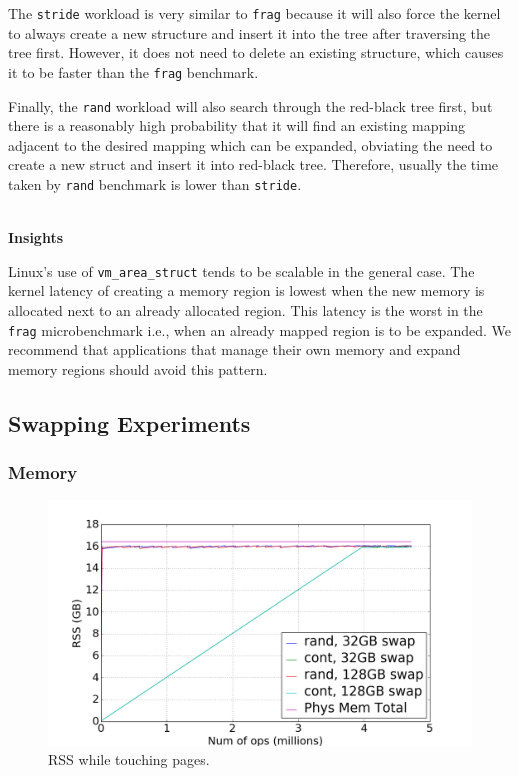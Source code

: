 \documentclass[twocolumn,11pt]{article}
\begin{document}
The \texttt{stride} workload is very similar to \texttt{frag} because it will also force the
kernel to always create a new structure and insert it into the tree after
traversing the tree first. However, it does not need to delete an existing
structure, which causes it to be faster than the \texttt{frag} benchmark.

Finally, the \texttt{rand} workload will also search through the red-black tree first,
but there is a reasonably high probability that it will find an existing
mapping adjacent to the desired mapping which can be expanded, obviating the
need to create a new struct and insert it into red-black tree. Therefore, usually
the time taken by \texttt{rand} benchmark is lower than \texttt{stride}.


~\\ \textbf{Insights}

Linux's use of \texttt{vm\_area\_struct} tends to be scalable in the general
case. The kernel latency of creating a memory region is lowest when the new
memory is allocated next to an already allocated region. This latency is the
worst in the \texttt{frag} microbenchmark i.e., when an already mapped region
is to be expanded.  We recommend that applications that manage their own memory
and expand memory regions should avoid this pattern.


\subsection{Swapping Experiments}

\subsubsection{Memory}

\begin{figure}[t]
    \includegraphics[width=\columnwidth]{figures/swap_rss}
    \caption{RSS while touching pages.  \label{fig:swap_rss}}
\end{figure}
\end{document}
